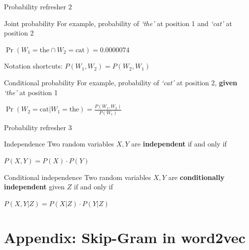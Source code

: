 \documentclass[12pt,aspectratio=169,handout]{beamer}
\begin{document}
\begin{frame}{Probability refresher 2}
	
	
	\begin{block}{Joint probability}
		For example, probability of \emph{`the'} at position 1 and \emph{`cat'} at position 2
		
		$\Pr(W_1 = \text{the} \cap W_2 = \text{cat}) = 0.0000074$
		
		\pause
		
		Notation shortcuts: $P(W_1, W_2) = P(W_2, W_1)$
	\end{block}
	
	\pause
	
	\begin{block}{Conditional probability}
		For example, probability of \emph{`cat'} at position 2, \textbf{given} \emph{`the'} at position 1
		
		$\Pr(W_2 = \text{cat} | W_1 = \text{the} ) = \frac{P(W_1, W_2)}{P(W_1)}$
	\end{block}
	
\end{frame}

\begin{frame}{Probability refresher 3}
	
	\begin{block}{Independence}
		Two random variables $X, Y$ are \textbf{independent} if and only if
		
		$P(X, Y) = P(X) \cdot P(Y)$
	\end{block}
	
	\pause
	
	\begin{block}{Conditional independence}
		Two random variables $X, Y$ are \textbf{conditionally independent} given $Z$ if and only if
		
		$P(X, Y | Z) = P(X|Z) \cdot P(Y|Z)$
	\end{block}
	
\end{frame}


\section{Appendix: Skip-Gram in word2vec}
\end{document}
